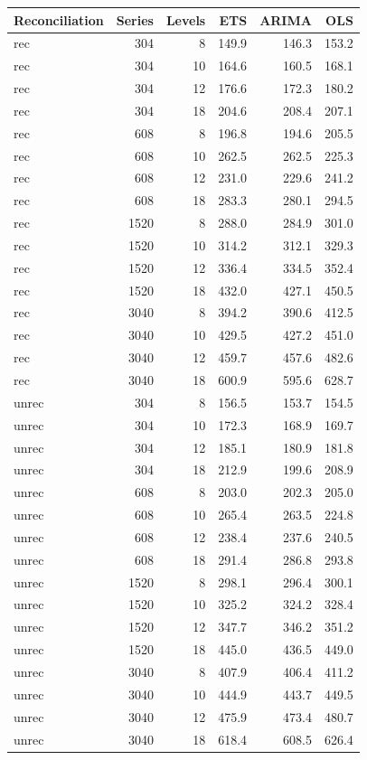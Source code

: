 \documentclass[11pt,a4paper,]{article}
\let\origtable\table
\let\endorigtable\endtable
\renewenvironment{table}[1][2] {
    \expandafter\origtable\expandafter[!htbp]
} {
    \endorigtable
}
\begin{document}
\begin{table}[!h]

\caption{\label{tab:TourismdatasimrollinglevelNS}Mean RMSE by number of hierarchy levels, number of bottom-level series, method, with/without reconciliation. Based on rolling origin  forecasts for a 24-month horizon, with error value 0.5.}
\centering
\begin{tabular}[t]{lrrrrr}
\toprule
Reconciliation & Series & Levels & ETS & ARIMA & OLS\\
\midrule
rec & 304 & 8 & 149.9 & 146.3 & 153.2\\
rec & 304 & 10 & 164.6 & 160.5 & 168.1\\
rec & 304 & 12 & 176.6 & 172.3 & 180.2\\
rec & 304 & 18 & 204.6 & 208.4 & 207.1\\
rec & 608 & 8 & 196.8 & 194.6 & 205.5\\
rec & 608 & 10 & 262.5 & 262.5 & 225.3\\
rec & 608 & 12 & 231.0 & 229.6 & 241.2\\
rec & 608 & 18 & 283.3 & 280.1 & 294.5\\
rec & 1520 & 8 & 288.0 & 284.9 & 301.0\\
rec & 1520 & 10 & 314.2 & 312.1 & 329.3\\
rec & 1520 & 12 & 336.4 & 334.5 & 352.4\\
rec & 1520 & 18 & 432.0 & 427.1 & 450.5\\
rec & 3040 & 8 & 394.2 & 390.6 & 412.5\\
rec & 3040 & 10 & 429.5 & 427.2 & 451.0\\
rec & 3040 & 12 & 459.7 & 457.6 & 482.6\\
rec & 3040 & 18 & 600.9 & 595.6 & 628.7\\
unrec & 304 & 8 & 156.5 & 153.7 & 154.5\\
unrec & 304 & 10 & 172.3 & 168.9 & 169.7\\
unrec & 304 & 12 & 185.1 & 180.9 & 181.8\\
unrec & 304 & 18 & 212.9 & 199.6 & 208.9\\
unrec & 608 & 8 & 203.0 & 202.3 & 205.0\\
unrec & 608 & 10 & 265.4 & 263.5 & 224.8\\
unrec & 608 & 12 & 238.4 & 237.6 & 240.5\\
unrec & 608 & 18 & 291.4 & 286.8 & 293.8\\
unrec & 1520 & 8 & 298.1 & 296.4 & 300.1\\
unrec & 1520 & 10 & 325.2 & 324.2 & 328.4\\
unrec & 1520 & 12 & 347.7 & 346.2 & 351.2\\
unrec & 1520 & 18 & 445.0 & 436.5 & 449.0\\
unrec & 3040 & 8 & 407.9 & 406.4 & 411.2\\
unrec & 3040 & 10 & 444.9 & 443.7 & 449.5\\
unrec & 3040 & 12 & 475.9 & 473.4 & 480.7\\
unrec & 3040 & 18 & 618.4 & 608.5 & 626.4\\
\bottomrule
\end{tabular}
\end{table}
\end{document}
